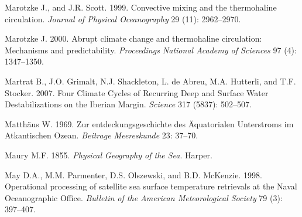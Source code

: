 \begin{thebibliography}{999}
Marotzke J., and J.R. Scott.  1999. Convective mixing and the
thermohaline circulation. \textit{Journal of Physical Oceanography} 29
(11): 2962--2970.
%

Marotzke J.  2000. Abrupt climate change and thermohaline circulation:
Mechanisms and predictability. \textit{Proceedings National Academy of
  Sciences} 97 (4): 1347--1350.
%

Martrat B., J.O. Grimalt, N.J. Shackleton, L. de Abreu, M.A. Hutterli,
and T.F. Stocker. 2007. Four Climate Cycles of Recurring Deep and
Surface Water Destabilizations on the Iberian Margin. \textit{Science}
317 (5837): 502--507.
%

Matth\"{a}us W. 1969. Zur entdeckungsgeschichte des \"{A}quatorialen
Unterstroms im Atkantischen Ozean. \textit{Beitrage Meereskunde} 23:
37--70.
%

Maury M.F.  1855. \textit{Physical Geography of the Sea}. Harper.
%

May D.A., M.M. Parmenter, D.S. Olszewski, and B.D. McKenzie. 1998.
Operational processing of satellite sea surface temperature retrievals
at the Naval Oceanographic Office. \textit{Bulletin of the American
  Meteorological Society} 79 (3): 397--407.
%


\end{thebibliography}
